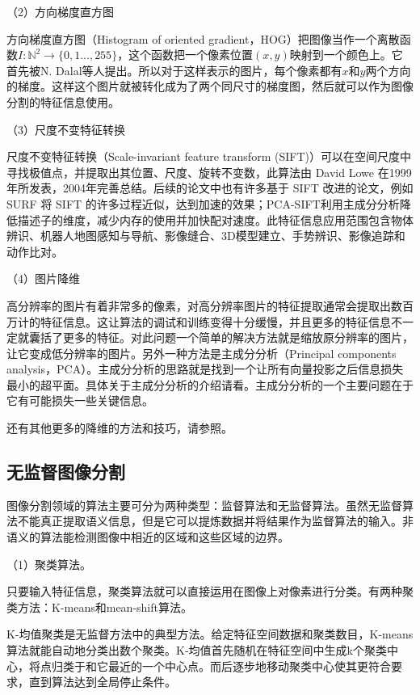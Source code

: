 \documentclass{article}
\begin{document}
（2）方向梯度直方图

方向梯度直方图（Histogram of oriented gradient，HOG）把图像当作一个离散函数$I: \mathbb{N}^2 \rightarrow \{0,1...,255\}$，这个函数把一个像素位置$(x,y)$映射到一个颜色上。它首先被N. Dalal等人提出\citep{1467360}。所以对于这样表示的图片，每个像素都有$x$和$y$两个方向的梯度。这样这个图片就被转化成为了两个同尺寸的梯度图，然后就可以作为图像分割的特征信息使用。

（3）尺度不变特征转换

尺度不变特征转换（Scale-invariant feature transform (SIFT)）可以在空间尺度中寻找极值点，并提取出其位置、尺度、旋转不变数，此算法由 David Lowe 在1999年所发表，2004年完善总结\citep{Lowe2004}。后续的论文中也有许多基于 SIFT 改进的论文，例如 SURF 将 SIFT 的许多过程近似，达到加速的效果；PCA-SIFT利用主成分分析降低描述子的维度，减少内存的使用并加快配对速度。此特征信息应用范围包含物体辨识、机器人地图感知与导航、影像缝合、3D模型建立、手势辨识、影像追踪和动作比对。

（4）图片降维

高分辨率的图片有着非常多的像素，对高分辨率图片的特征提取通常会提取出数百万计的特征信息。这让算法的调试和训练变得十分缓慢，并且更多的特征信息不一定就囊括了更多的特征。对此问题一个简单的解决方法就是缩放原分辨率的图片，让它变成低分辨率的图片。另外一种方法是主成分分析（Principal components analysis，PCA）。主成分分析的思路就是找到一个让所有向量投影之后信息损失最小的超平面。具体关于主成分分析的介绍请看\citep{shlens2014tutorial}。主成分分析的一个主要问题在于它有可能损失一些关键信息。

还有其他更多的降维的方法和技巧，请参照\citep{Maaten08dimensionalityreduction}。

\subsection{无监督图像分割}
图像分割领域的算法主要可分为两种类型：监督算法和无监督算法。虽然无监督算法不能真正提取语义信息，但是它可以提炼数据并将结果作为监督算法的输入。非语义的算法能检测图像中相近的区域和这些区域的边界。

（1）聚类算法。

只要输入特征信息，聚类算法就可以直接运用在图像上对像素进行分类。有两种聚类方法：K-means和mean-shift算法。

K-均值聚类是无监督方法中的典型方法。给定特征空间数据和聚类数目，K-means算法就能自动地分类出数个聚类。K-均值首先随机在特征空间中生成k个聚类中心，将点归类于和它最近的一个中心点。而后逐步地移动聚类中心使其更符合要求，直到算法达到全局停止条件。
\end{document}
